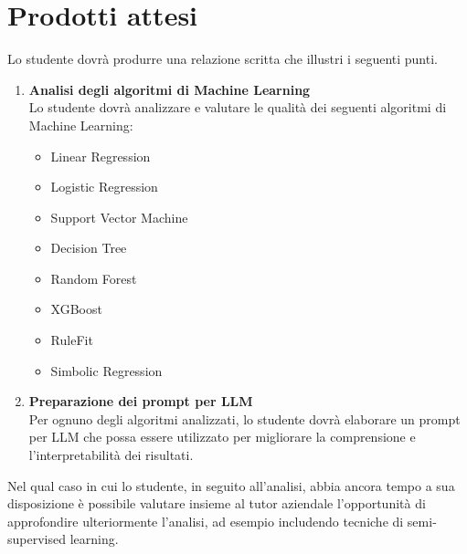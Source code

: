 \section{Prodotti attesi}
Lo studente dovrà produrre una relazione scritta che illustri i seguenti punti.
\begin{enumerate}
    \item  \textbf{Analisi degli algoritmi di Machine Learning}\\
    Lo studente dovrà analizzare e valutare le qualità dei seguenti algoritmi di Machine Learning:
    \begin{itemize} 
        \item Linear Regression \\
        \item Logistic Regression \\
        \item Support Vector Machine \\
        \item Decision Tree \\
        \item Random Forest \\
        \item XGBoost \\
        \item RuleFit \\
        \item Simbolic Regression \\
    \end{itemize}
        
    \item \textbf{Preparazione dei prompt per LLM} \\
    Per ognuno degli algoritmi analizzati, lo studente dovrà elaborare un prompt per LLM che possa essere utilizzato per migliorare la comprensione e l'interpretabilità dei risultati.
\end{enumerate}

Nel qual caso in cui lo studente, in seguito all'analisi, abbia ancora tempo a sua disposizione è possibile valutare insieme al tutor aziendale l'opportunità di approfondire ulteriormente l'analisi, ad esempio includendo tecniche di semi-supervised learning.

